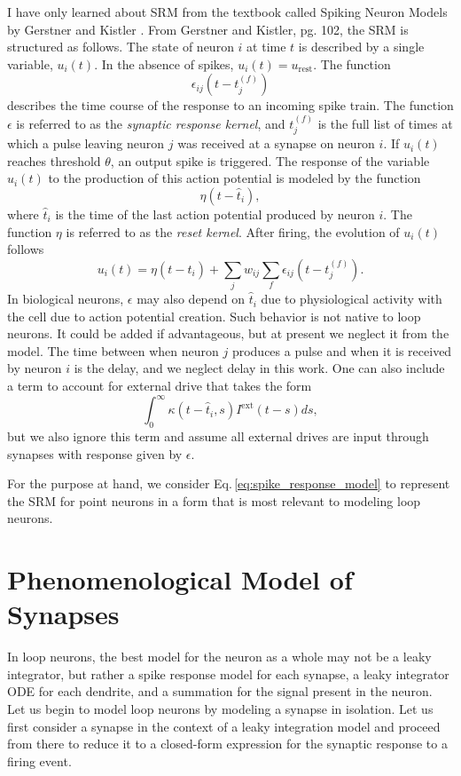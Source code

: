 \documentclass[]{article}
\begin{document}
I have only learned about SRM from the textbook called Spiking Neuron Models by Gerstner and Kistler \cite{geki2002}. From Gerstner and Kistler, pg. 102, the SRM is structured as follows. The state of neuron $i$ at time $t$ is described by a single variable, $u_i(t)$. In the absence of spikes, $u_i(t) = u_{\mathrm{rest}}$. The function
\begin{equation}
\label{eq:synaptic_response_kernel}
\epsilon_{ij}(t-t_j^{(f)})
\end{equation}
describes the time course of the response to an incoming spike train. The function $\epsilon$ is referred to as the \textit{synaptic response kernel}, and $t_j^{(f)}$ is the full list of times at which a pulse leaving neuron $j$ was received at a synapse on neuron $i$. If $u_i(t)$ reaches threshold $\theta$, an output spike is triggered. The response of the variable $u_i(t)$ to the production of this action potential is modeled by the function
\begin{equation}
\label{eq:reset_kernel}
\eta(t-\hat{t}_i),
\end{equation}
where $\hat{t}_i$ is the time of the last action potential produced by neuron $i$. The function $\eta$ is referred to as the \textit{reset kernel}. After firing, the evolution of $u_i(t)$ follows
\begin{equation}
\label{eq:spike_response_model}
u_i(t) = \eta(t-\hat{t}_i)+\sum_j w_{ij}\sum_f \epsilon_{ij}(t-t_j^{(f)}).
\end{equation}
In biological neurons, $\epsilon$ may also depend on $\hat{t}_i$ due to physiological activity with the cell due to action potential creation. Such behavior is not native to loop neurons. It could be added if advantageous, but at present we neglect it from the model. The time between when neuron $j$ produces a pulse and when it is received by neuron $i$ is the delay, and we neglect delay in this work. One can also include a term to account for external drive that takes the form
\begin{equation}
\label{eq:external_drive}
\int_0^{\infty}\kappa(t-\hat{t}_i,s)I^{\mathrm{ext}}(t-s)ds,
\end{equation}
but we also ignore this term and assume all external drives are input through synapses with response given by $\epsilon$.

For the purpose at hand, we consider Eq.\,\ref{eq:spike_response_model} to represent the SRM for point neurons in a form that is most relevant to modeling loop neurons.

\section{\label{sec:synapses}Phenomenological Model of Synapses}
In loop neurons, the best model for the neuron as a whole may not be a leaky integrator, but rather a spike response model for each synapse, a leaky integrator ODE for each dendrite, and a summation for the signal present in the neuron. Let us begin to model loop neurons by modeling a synapse in isolation. Let us first consider a synapse in the context of a leaky integration model and proceed from there to reduce it to a closed-form expression for the synaptic response to a firing event. 
\end{document}
